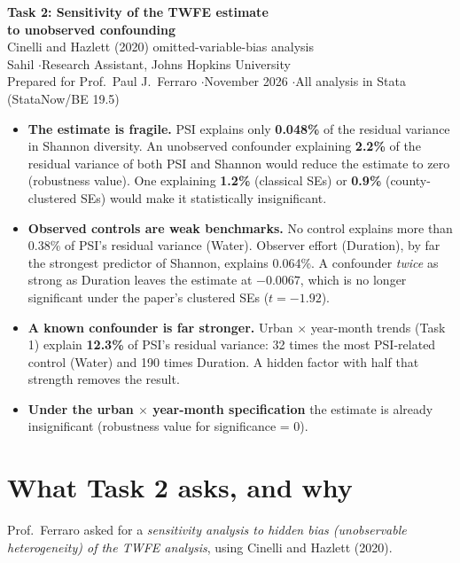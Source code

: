 \documentclass[11pt]{article}
\begin{document}
\begin{center}
{\LARGE\bfseries Task 2: Sensitivity of the TWFE estimate\\[2pt] to unobserved confounding}\\[6pt]
{\large Cinelli and Hazlett (2020) omitted-variable-bias analysis}\\[8pt]
Sahil \quad$\cdot$\quad Research Assistant, Johns Hopkins University\\
{\small Prepared for Prof.\ Paul J.\ Ferraro \quad$\cdot$\quad November 2026 \quad$\cdot$\quad All analysis in Stata (StataNow/BE 19.5)}
\end{center}

\begin{summarybox}
\small
\begin{itemize}[leftmargin=12pt]
\item \textbf{The estimate is fragile.} PSI explains only \textbf{0.048\%} of the residual variance in Shannon diversity. An unobserved confounder explaining \textbf{2.2\%} of the residual variance of both PSI and Shannon would reduce the estimate to zero (robustness value). One explaining \textbf{1.2\%} (classical SEs) or \textbf{0.9\%} (county-clustered SEs) would make it statistically insignificant.
\item \textbf{Observed controls are weak benchmarks.} No control explains more than 0.38\% of PSI's residual variance (Water). Observer effort (Duration), by far the strongest predictor of Shannon, explains 0.064\%. A confounder \emph{twice} as strong as Duration leaves the estimate at $-0.0067$, which is no longer significant under the paper's clustered SEs ($t=-1.92$).
\item \textbf{A known confounder is far stronger.} Urban $\times$ year-month trends (Task 1) explain \textbf{12.3\%} of PSI's residual variance: 32 times the most PSI-related control (Water) and 190 times Duration. A hidden factor with half that strength removes the result.
\item \textbf{Under the urban $\times$ year-month specification} the estimate is already insignificant (robustness value for significance = 0).
\end{itemize}
\end{summarybox}

\tableofcontents

\section{What Task 2 asks, and why}
Prof.\ Ferraro asked for a \emph{sensitivity analysis to hidden bias (unobservable heterogeneity) of the TWFE analysis}, using Cinelli and Hazlett (2020).
\end{document}

